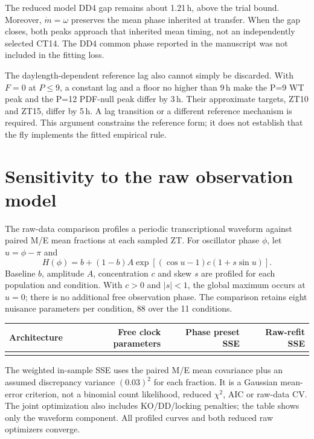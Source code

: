 \documentclass[11pt,letterpaper]{article}
\begin{document}
The reduced model DD4 gap remains about 1.21\,h, above the trial bound.
Moreover, $\dot m=\omega$ preserves the mean phase inherited at transfer.
When the gap closes, both peaks approach that inherited mean timing,
not an independently selected CT14. The DD4 common phase reported in
the manuscript was not included in the fitting loss.

The daylength-dependent reference lag also cannot simply be discarded.
With $F=0$ at $P\leq9$, a constant lag and a floor no higher than 9\,h
make the P=9 WT peak and the P=12 PDF-null peak differ by 3\,h.
Their approximate targets, ZT10 and ZT15, differ by 5\,h.
A lag transition or a different reference mechanism is required.
This argument constrains the reference form; it does not establish
that the fly implements the fitted empirical rule.

\clearpage
\section{Sensitivity to the raw observation model}
\label{sec:raw}

The raw-data comparison profiles a periodic transcriptional waveform
against paired M/E mean fractions at each sampled ZT.
For oscillator phase $\phi$, let $u=\phi-\pi$ and
\begin{equation}
H(\phi)=b+(1-b)A
   \exp\!\left[(\cos u-1)c(1+s\sin u)\right].
\end{equation}
Baseline $b$, amplitude $A$, concentration $c$ and skew $s$ are
profiled for each population and condition. With $c>0$ and $|s|<1$,
the global maximum occurs at $u=0$; there is no additional free
observation phase. The comparison retains eight nuisance parameters
per condition, 88 over the 11 conditions.

\begin{center}
\begin{tabular}{lrrr}
\toprule
Architecture & Free clock parameters & Phase preset SSE & Raw-refit SSE\\
\midrule
\\
\bottomrule
\end{tabular}
\end{center}

The weighted in-sample SSE uses the paired M/E mean covariance plus
an assumed discrepancy variance $(0.03)^2$ for each fraction.
It is a Gaussian mean-error criterion, not a binomial count likelihood,
reduced $\chi^2$, AIC or raw-data CV. The joint optimization also includes
KO/DD/locking penalties; the table shows only the waveform component.
All profiled curves and both reduced raw optimizers converge.
\end{document}
